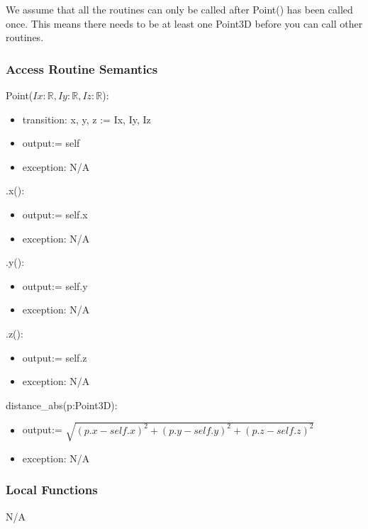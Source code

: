 \documentclass[12pt, titlepage]{article}
\begin{document}
We assume that all the routines can only be called after Point() has been 
called once. This means there needs to be at least one Point3D before you can 
call other routines.

\subsubsection{Access Routine Semantics}\label{mPoints-programs}
\noindent Point($Ix: \mathbb{R}, Iy: \mathbb{R}, Iz: \mathbb{R}$):
\begin{itemize}
	\item transition: x, y, z := Ix, Iy, Iz
	\item output:= self
	\item exception: N/A
\end{itemize}

\noindent .x():
\begin{itemize}
	\item output:= self.x
	\item exception: N/A
\end{itemize}

\noindent .y():
\begin{itemize}
	\item output:= self.y
	\item exception: N/A
\end{itemize}

\noindent .z():
\begin{itemize}
	\item output:= self.z
	\item exception: N/A
\end{itemize} 

\noindent distance\_abs(p:Point3D):
\begin{itemize}
	\item output:= $\sqrt{(p.x-self.x)^2 + (p.y-self.y)^2 + (p.z-self.z)^2}$
	\item exception: N/A
\end{itemize} 

\subsubsection{Local Functions}
N/A

\end{document}
